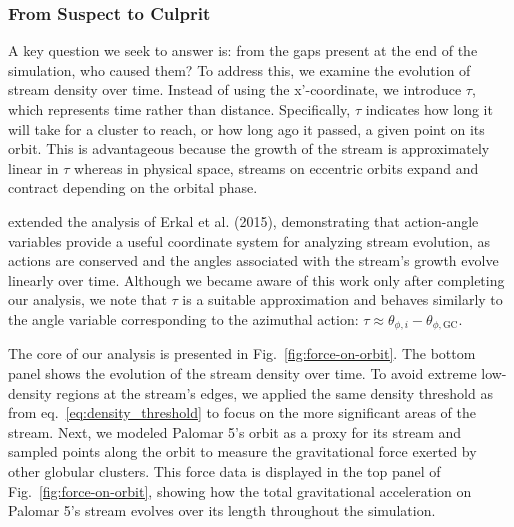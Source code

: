 \documentclass[draft]{aa}
\begin{document}
    
    \subsubsection*{From Suspect to Culprit} \label{sec:SuspectToCulprit}

      A key question we seek to answer is: from the gaps present at the end of the simulation, who caused them? To address this, we examine the evolution of stream density over time. Instead of using the x'-coordinate, we introduce $\tau$, which represents time rather than distance. Specifically, $\tau$ indicates how long it will take for a cluster to reach, or how long ago it passed, a given point on its orbit. This is advantageous because the growth of the stream is approximately linear in $\tau$ whereas in physical space, streams on eccentric orbits expand and contract depending on the orbital phase.


      \citet{sanders2016dynamics} extended the analysis of Erkal et al. (2015), demonstrating that action-angle variables provide a useful coordinate system for analyzing stream evolution, as actions are conserved and the angles associated with the stream's growth evolve linearly over time. Although we became aware of this work only after completing our analysis, we note that $\tau$ is a suitable approximation and behaves similarly to the angle variable corresponding to the azimuthal action: $\tau \approx \theta_{\phi,i} - \theta_{\phi,\text{GC}}$.

      The core of our analysis is presented in Fig.~\ref{fig:force-on-orbit}. The bottom panel shows the evolution of the stream density over time. To avoid extreme low-density regions at the stream's edges, we applied the same density threshold as from eq.~\ref{eq:density_threshold} to focus on the more significant areas of the stream. Next, we modeled Palomar 5's orbit as a proxy for its stream and sampled points along the orbit to measure the gravitational force exerted by other globular clusters. This force data is displayed in the top panel of Fig.~\ref{fig:force-on-orbit}, showing how the total gravitational acceleration on Palomar 5's stream evolves over its length throughout the simulation.
\end{document}

